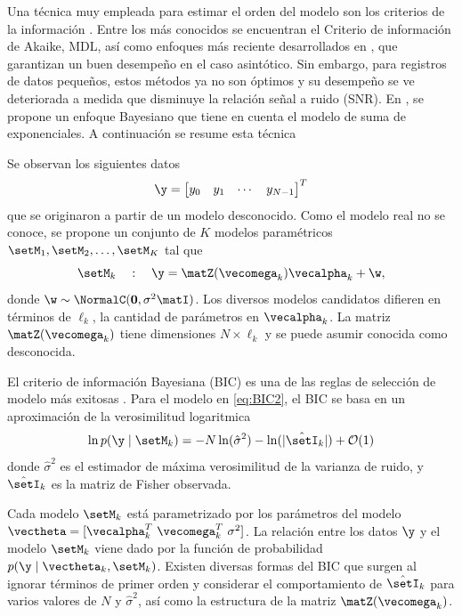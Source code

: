 	Una técnica muy empleada para estimar el orden del modelo son los criterios de la información \cite{Stoica2004}. Entre los más conocidos se encuentran el Criterio de información de Akaike, MDL, así como enfoques más reciente desarrollados en \cite{Mariani2015, Nielsen2013}, que garantizan un buen desempeño en el caso asintótico. Sin embargo, para registros de datos pequeños, estos métodos ya no son óptimos y su desempeño se ve deteriorada a medida que disminuye la relación señal a ruido (SNR). En \cite{Nielsen2013}, se propone un enfoque Bayesiano que tiene en cuenta el modelo de suma de exponenciales. A continuación se resume esta técnica
	
	Se observan los siguientes datos
	\begin{equation}
		\y = \begin{bmatrix} y_0 & y_1 & \cdots & y_{N-1}
		\end{bmatrix}^T
		\label{eq:BIC1}
	\end{equation}
	que se originaron a partir de un modelo desconocido. Como el modelo real no se conoce, se propone un conjunto de $K$ modelos paramétricos $\setM_1,\setM_2,\ldots,\setM_K$ tal que
	\begin{equation}
		\setM_k\quad : \quad \y = \matZ(\vecomega_k)\vecalpha_k + \w,
		\label{eq:BIC2} 
	\end{equation}
	donde $\w\sim\NormalC(\mathbf{0},\sigma^2\matI)$. Los diversos modelos candidatos difieren en términos de $\ell_k$, la cantidad de parámetros en $\vecalpha_k$. La matriz $\matZ(\vecomega_k)$ tiene dimensiones $N\times \ell_k$ y se puede asumir conocida como desconocida.
	
	El criterio de información Bayesiana (BIC) es una de las reglas de selección de modelo más  exitosas \cite{Stoica2005}. Para el modelo en \eqref{eq:BIC2}, el BIC se basa en un aproximación de la verosimilitud logaritmica
	\begin{equation}
		\ln p(\y \mid \setM_k) = -N\ln(\hat{\sigma}^2) - \ln(|\hat{\setI}_k|) + \mathcal{O}(1)
		\label{eq:BIC3} 
	\end{equation}
	donde $\hat{\sigma}^2$ es el estimador de máxima verosimilitud de la varianza de ruido, y $\hat{\setI}_k$ es la matriz de Fisher observada.
	
	Cada modelo $\setM_k$ está parametrizado por los parámetros del modelo $\vectheta = [\vecalpha_k^T\ \vecomega_k^T\ \sigma^2]$. La relación entre los datos $\y$ y el modelo $\setM_k$ viene dado por la función de probabilidad $p(\y\mid \vectheta_k,\setM_k)$. Existen diversas formas del BIC que surgen al ignorar términos de primer orden y considerar el comportamiento de $\hat{\setI}_k$ para varios valores de $N$ y $\hat{\sigma}^2$, así como la estructura de la matriz $\matZ(\vecomega_k)$. 
	
